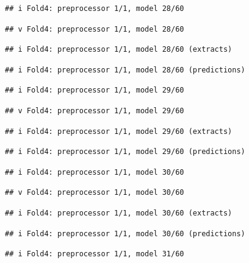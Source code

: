 \documentclass[
]{article}
\begin{document}
\begin{verbatim}
## i Fold4: preprocessor 1/1, model 28/60
\end{verbatim}

\begin{verbatim}
## v Fold4: preprocessor 1/1, model 28/60
\end{verbatim}

\begin{verbatim}
## i Fold4: preprocessor 1/1, model 28/60 (extracts)
\end{verbatim}

\begin{verbatim}
## i Fold4: preprocessor 1/1, model 28/60 (predictions)
\end{verbatim}

\begin{verbatim}
## i Fold4: preprocessor 1/1, model 29/60
\end{verbatim}

\begin{verbatim}
## v Fold4: preprocessor 1/1, model 29/60
\end{verbatim}

\begin{verbatim}
## i Fold4: preprocessor 1/1, model 29/60 (extracts)
\end{verbatim}

\begin{verbatim}
## i Fold4: preprocessor 1/1, model 29/60 (predictions)
\end{verbatim}

\begin{verbatim}
## i Fold4: preprocessor 1/1, model 30/60
\end{verbatim}

\begin{verbatim}
## v Fold4: preprocessor 1/1, model 30/60
\end{verbatim}

\begin{verbatim}
## i Fold4: preprocessor 1/1, model 30/60 (extracts)
\end{verbatim}

\begin{verbatim}
## i Fold4: preprocessor 1/1, model 30/60 (predictions)
\end{verbatim}

\begin{verbatim}
## i Fold4: preprocessor 1/1, model 31/60
\end{verbatim}
\end{document}
